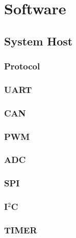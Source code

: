\chapter{Software}
\label{ch:SW}


\section{System Host}
\label{sec:SW_systemhost}

\subsection{Protocol}
\label{subsec:SW_protocol}

\subsection{UART}
\label{subsec:SW_uart}

\subsection{CAN}
\label{subsec:SW_can}

\subsection{PWM}
\label{subsec:SW_pwm}

\subsection{ADC}
\label{subsec:SW_adc}

\subsection{SPI}
\label{subsec:SW_spi}

\subsection{I$ ^{2} $C}
\label{subsec:SW_i2c}

\subsection{TIMER}
\label{subsec:SW_timer}

